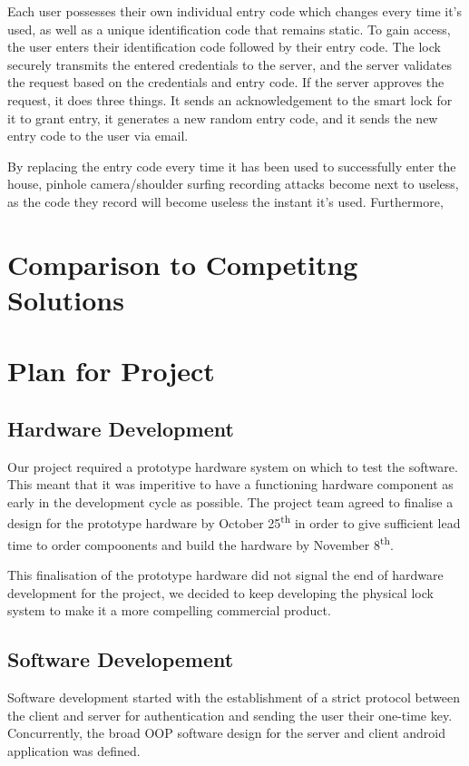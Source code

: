\documentclass[conference]{IEEEtran}
\begin{document}
Each user possesses their own individual entry code which changes every time it’s used, as well as a unique identification code that remains static. To gain access, the user enters their identification code followed by their entry code. The lock securely transmits the entered credentials to the server, and the server validates the request based on the credentials and entry code. If the server approves the request, it does three things. It sends an acknowledgement to the smart lock for it to grant entry, it generates a new random entry code, and it sends the new entry code to the user via email.

By replacing the entry code every time it has been used to successfully enter the house, pinhole camera/shoulder surfing recording attacks become next to useless, as the code they record will become useless the instant it’s used. Furthermore,
\section{Comparison to Competitng Solutions}

\section{Plan for Project}
\subsection{Hardware Development}
	Our project required a prototype hardware system on which to test the software. This meant that it was imperitive to have a functioning hardware component as early in the development cycle as possible. The project team agreed to finalise a design for the prototype hardware by October 25\textsuperscript{th} in order to give sufficient lead time to order compoonents and build the hardware by November 8\textsuperscript{th}.


	This finalisation of the prototype hardware did not signal the end of hardware development for the project, we decided to keep developing the physical lock system to make it a more compelling commercial product.

\subsection{Software Developement}
	Software development started with the establishment of a strict protocol between the client and server for authentication and sending the user their one-time key. Concurrently, the broad OOP software design for the server and client android application was defined.
\end{document}
